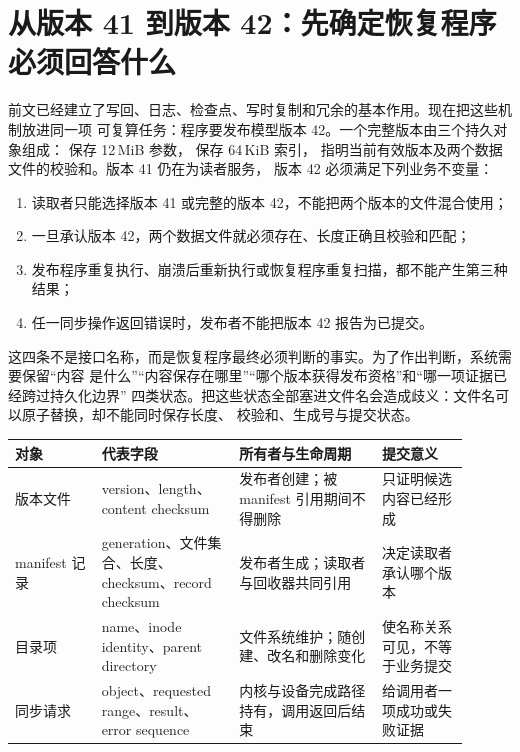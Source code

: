 \section{从版本 41 到版本 42：先确定恢复程序必须回答什么}

前文已经建立了写回、日志、检查点、写时复制和冗余的基本作用。现在把这些机制放进同一项
可复算任务：程序要发布模型版本 42。一个完整版本由三个持久对象组成：
 保存 12\,MiB 参数， 保存 64\,KiB 索引，
 指明当前有效版本及两个数据文件的校验和。版本 41 仍在为读者服务，
版本 42 必须满足下列业务不变量：

\begin{enumerate}
\tightlist
\item 读取者只能选择版本 41 或完整的版本 42，不能把两个版本的文件混合使用；
\item {} 一旦承认版本 42，两个数据文件就必须存在、长度正确且校验和匹配；
\item 发布程序重复执行、崩溃后重新执行或恢复程序重复扫描，都不能产生第三种结果；
\item 任一同步操作返回错误时，发布者不能把版本 42 报告为已提交。
\end{enumerate}

这四条不是接口名称，而是恢复程序最终必须判断的事实。为了作出判断，系统需要保留“内容
是什么”“内容保存在哪里”“哪个版本获得发布资格”和“哪一项证据已经跨过持久化边界”
四类状态。把这些状态全部塞进文件名会造成歧义：文件名可以原子替换，却不能同时保存长度、
校验和、生成号与提交状态。

\begin{longtable}{|L{0.17\linewidth}|L{0.27\linewidth}|L{0.29\linewidth}|L{0.17\linewidth}|}
\hline
对象 & 代表字段 & 所有者与生命周期 & 提交意义 \\ \hline
版本文件 & version、length、content checksum &
发布者创建；被 manifest 引用期间不得删除 & 只证明候选内容已经形成 \\\tablerowrule
manifest 记录 & generation、文件集合、长度、checksum、record checksum &
发布者生成；读取者与回收器共同引用 & 决定读取者承认哪个版本 \\\tablerowrule
目录项 & name、inode identity、parent directory &
文件系统维护；随创建、改名和删除变化 & 使名称关系可见，不等于业务提交 \\\tablerowrule
同步请求 & object、requested range、result、error sequence &
内核与设备完成路径持有，调用返回后结束 & 给调用者一项成功或失败证据 \\
\hline
\end{longtable}

